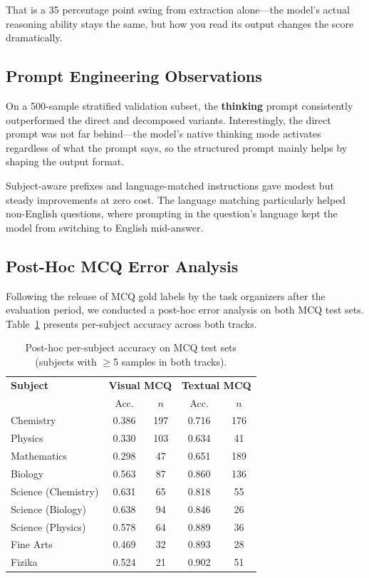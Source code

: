 \documentclass[]{ceurart}
\begin{document}
That is a 35 percentage point swing from extraction alone---the model's actual reasoning ability stays the same, but how you read its output changes the score dramatically.

\subsection{Prompt Engineering Observations}
\label{sec:prompt_ablation}

On a 500-sample stratified validation subset, the \textbf{thinking} prompt consistently outperformed the direct and decomposed variants.
Interestingly, the direct prompt was not far behind---the model's native thinking mode activates regardless of what the prompt says, so the structured prompt mainly helps by shaping the output format.

Subject-aware prefixes and language-matched instructions gave modest but steady improvements at zero cost.
The language matching particularly helped non-English questions, where prompting in the question's language kept the model from switching to English mid-answer.

\subsection{Post-Hoc MCQ Error Analysis}
\label{sec:posthoc}

Following the release of MCQ gold labels by the task organizers after the evaluation period, we conducted a post-hoc error analysis on both MCQ test sets.
Table~\ref{tab:per_subject} presents per-subject accuracy across both tracks.

\begin{table}[t]
\centering
\caption{Post-hoc per-subject accuracy on MCQ test sets (subjects with $\geq$5 samples in both tracks).}
\label{tab:per_subject}
\begin{tabular}{lcccc}
\toprule
\textbf{Subject} & \multicolumn{2}{c}{\textbf{Visual MCQ}} & \multicolumn{2}{c}{\textbf{Textual MCQ}} \\
 & Acc. & $n$ & Acc. & $n$ \\
\midrule
Chemistry              & 0.386 & 197 & 0.716 & 176 \\
Physics                & 0.330 & 103 & 0.634 & 41 \\
Mathematics            & 0.298 & 47  & 0.651 & 189 \\
Biology                & 0.563 & 87  & 0.860 & 136 \\
Science (Chemistry)    & 0.631 & 65  & 0.818 & 55 \\
Science (Biology)      & 0.638 & 94  & 0.846 & 26 \\
Science (Physics)      & 0.578 & 64  & 0.889 & 36 \\
Fine Arts              & 0.469 & 32  & 0.893 & 28 \\
Fizika                 & 0.524 & 21  & 0.902 & 51 \\
\bottomrule
\end{tabular}
\end{table}
\end{document}
